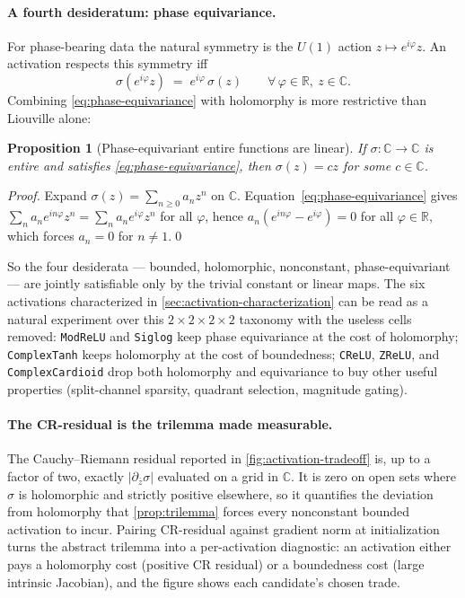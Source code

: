 \documentclass{article}
\providecommand{\Cref}[1]{\autoref{#1}}
\newtheorem{proposition}{Proposition}
\newcommand{\code}[1]{\texttt{#1}}
\begin{document}
\paragraph{A fourth desideratum: phase equivariance.}
For phase-bearing data the natural symmetry is the $U(1)$ action
$z\mapsto e^{i\varphi}z$. An activation respects this symmetry iff
\begin{equation}
  \label{eq:phase-equivariance}
  \sigma(e^{i\varphi} z) \;=\; e^{i\varphi}\,\sigma(z)
  \qquad \forall\,\varphi\in\mathbb{R},\ z\in\mathbb{C}.
\end{equation}
Combining \eqref{eq:phase-equivariance} with holomorphy is more
restrictive than Liouville alone:

\begin{proposition}[Phase-equivariant entire functions are linear]
\label{prop:equivariant-entire}
If $\sigma:\mathbb{C}\to\mathbb{C}$ is entire and satisfies
\eqref{eq:phase-equivariance}, then $\sigma(z)=cz$ for some
$c\in\mathbb{C}$.
\end{proposition}

\begin{proof}
Expand $\sigma(z)=\sum_{n\geq 0}a_n z^n$ on $\mathbb{C}$.
Equation~\eqref{eq:phase-equivariance} gives
$\sum_n a_n e^{in\varphi}z^n = \sum_n a_n e^{i\varphi} z^n$ for all
$\varphi$, hence $a_n(e^{in\varphi}-e^{i\varphi})=0$ for all
$\varphi\in\mathbb{R}$, which forces $a_n=0$ for $n\neq 1$.\qed
\end{proof}

So the four desiderata --- bounded, holomorphic, nonconstant,
phase-equivariant --- are jointly satisfiable only by the trivial
constant or linear maps. The six activations characterized in
\Cref{sec:activation-characterization} can be read as a natural
experiment over this $2\times 2\times 2\times 2$ taxonomy with the
useless cells removed: \code{ModReLU} and \code{Siglog} keep phase
equivariance at the cost of holomorphy; \code{ComplexTanh} keeps
holomorphy at the cost of boundedness; \code{CReLU}, \code{ZReLU},
and \code{ComplexCardioid} drop both holomorphy and equivariance to
buy other useful properties (split-channel sparsity, quadrant
selection, magnitude gating).

\paragraph{The CR-residual is the trilemma made measurable.}
The Cauchy--Riemann residual reported in
\Cref{fig:activation-tradeoff} is, up to a factor of two, exactly
$|\partial_{\bar z}\sigma|$ evaluated on a grid in $\mathbb{C}$. It is
zero on open sets where $\sigma$ is holomorphic and strictly positive
elsewhere, so it quantifies the deviation from holomorphy that
\Cref{prop:trilemma} forces every nonconstant bounded activation to
incur. Pairing CR-residual against gradient norm at initialization
turns the abstract trilemma into a per-activation diagnostic: an
activation either pays a holomorphy cost (positive CR residual) or a
boundedness cost (large intrinsic Jacobian), and the figure shows
each candidate's chosen trade.
\end{document}
